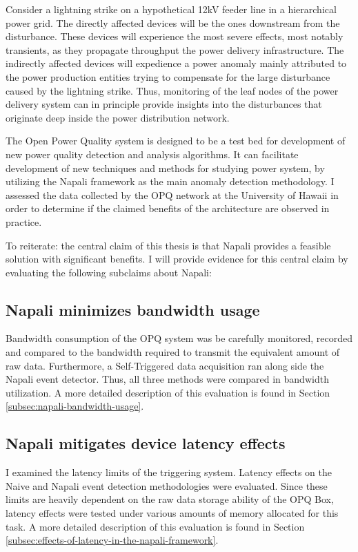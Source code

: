 Consider a lightning strike on a hypothetical 12kV feeder line in a hierarchical power grid.
The directly affected devices will be the ones downstream from the disturbance.
These devices will experience the most severe effects, most notably transients, as they propagate throughput the power delivery infrastructure.
The indirectly affected devices will expedience a power anomaly mainly attributed to the power production entities trying to compensate for the large disturbance caused by the lightning strike.
Thus, monitoring of the leaf nodes of the power delivery system can in principle provide insights into the disturbances that originate deep inside the power distribution network.

The Open Power Quality system is designed to be a test bed for development of new power quality detection and analysis algorithms.
It can facilitate development of new techniques and methods for studying power system, by utilizing the Napali framework as the main anomaly detection methodology.
I assessed the data collected by the OPQ network at the University of Hawaii in order to determine if the claimed benefits of the architecture are observed in practice.


To reiterate: the central claim of this thesis is that Napali provides a feasible solution with significant benefits.
I will provide evidence for this central claim by evaluating the following subclaims about Napali:

\subsection{Napali minimizes bandwidth usage}\label{subsec:napali-minimizes-bandwidth-useage}
Bandwidth consumption of the OPQ system was be carefully monitored, recorded and compared to the bandwidth required to transmit the equivalent amount of raw data.
Furthermore, a Self-Triggered data acquisition ran along side the Napali event detector.
Thus, all three methods were compared in bandwidth utilization.
A more detailed description of this evaluation is found in Section \ref{subsec:napali-bandwidth-usage}.

\subsection{Napali mitigates device latency effects}\label{subsec:effects-of-latency-are-minimized:}
I examined the latency limits of the triggering system.
Latency effects on the Naive and Napali event detection methodologies were evaluated.
Since these limits are heavily dependent on the raw data storage ability of the OPQ Box, latency effects were tested under various amounts of memory allocated for this task.
A more detailed description of this evaluation is found in Section \ref{subsec:effects-of-latency-in-the-napali-framework}.

